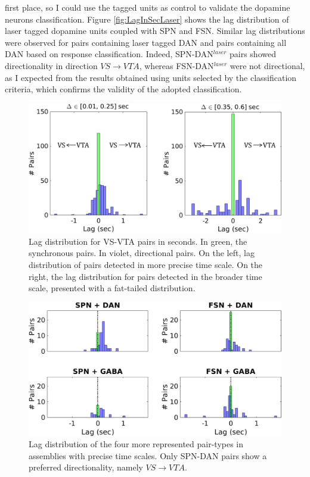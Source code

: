 first place, so I could use the tagged units as control to validate the dopamine neurons classification. Figure \ref{fig:LagInSecLaser} shows the lag distribution of laser tagged dopamine units coupled with SPN and FSN. Similar lag distributions were observed for pairs containing laser tagged DAN and pairs containing all DAN based on response classification. Indeed, SPN-DAN$^{laser}$ pairs showed directionality in direction $VS\rightarrow VTA$, whereas FSN-DAN$^{laser}$ were not directional, as I expected from the results obtained using units selected by the classification criteria, which confirms the validity of the adopted classification.\\
\begin{figure}[H]
\centering
\includegraphics[scale=0.65]{figures/LagGeneral1.pdf}
\caption{Lag distribution for VS-VTA pairs in seconds. In green, the synchronous pairs. In violet, directional pairs. On the left, lag distribution of pairs detected in more precise time scale. On the right, the lag distribution for pairs detected in the broader time scale, presented with a fat-tailed distribution.}
\label{fig:LagInSecAll}
\end{figure}
\begin{figure}[H]
\centering
\includegraphics[scale=0.52]{figures/LagSec4Typo3VS.pdf}
\caption{Lag distribution of the four more represented pair-types in assemblies with precise time scales. Only SPN-DAN pairs show a preferred directionality, namely $VS\rightarrow VTA$.}
\label{fig:LagInSec4typo}
\end{figure}
